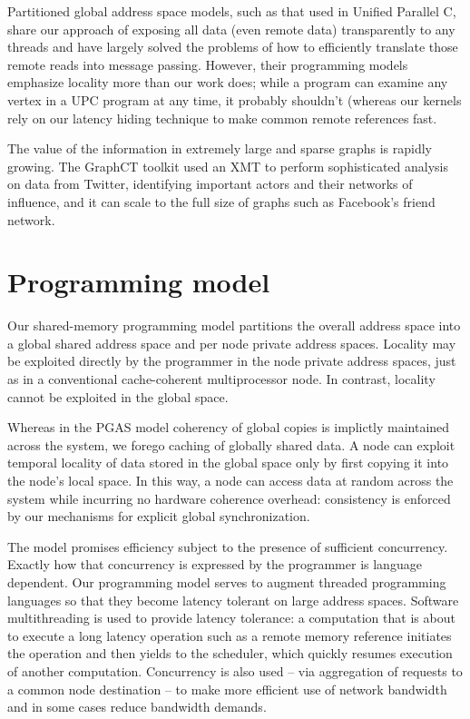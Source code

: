 \documentclass{acm_proc_article-sp}
\begin{document}
Partitioned global address space models, such as that used in Unified Parallel C,
 share our approach of exposing all data (even remote data)
 transparently to any threads and have largely solved the problems of
 how to efficiently translate those remote reads into message
 passing.  However, their programming models emphasize locality more
 than our work does; while a program can examine any vertex in a UPC
 program at any time, it probably shouldn't (whereas our kernels rely on our
 latency hiding technique to make common remote references fast.

The value of the information in extremely large and sparse graphs is
rapidly growing.  The GraphCT toolkit \cite{ediger-graphct} used an XMT to perform
sophisticated analysis on data from Twitter, identifying important
actors and their networks of influence, and it can scale to the full
size of graphs such as Facebook's friend network.
\section{Programming model}
\label{sec:model}

Our shared-memory programming model partitions the overall address
space into a global shared address space and per node private address
spaces.  Locality may be exploited directly by the programmer in the
node private address spaces, just as in a conventional cache-coherent
multiprocessor node.  In contrast, locality cannot be exploited in 
the global space.

Whereas in the PGAS model coherency of global copies is implictly
maintained across the system, we forego caching of globally shared
data.  A node can exploit temporal locality of data stored in
the global space only by first copying it into the node's local space.
In this way, a node can access data at random across the system while
incurring no hardware coherence overhead: consistency is enforced by
our mechanisms for explicit global synchronization.

The model promises efficiency subject to the presence of sufficient
concurrency.  Exactly how that concurrency is expressed by the
programmer is language dependent.  Our programming model serves to
augment threaded programming languages so that they become latency
tolerant on large address spaces.  Software multithreading is used to
provide latency tolerance: a computation that is about to execute a
long latency operation such as a remote memory reference initiates the
operation and then yields to the scheduler, which quickly resumes
execution of another computation.  Concurrency is also used -- via
aggregation of requests to a common node destination -- to make more
efficient use of network bandwidth and in some cases reduce bandwidth
demands.
\end{document}
